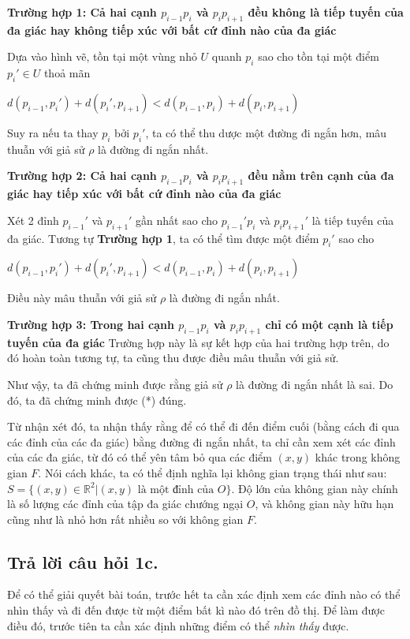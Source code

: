 \documentclass[a4paper, 11pt]{article}
\begin{document}
\textbf{Trường hợp 1: Cả hai cạnh $p_{i-1}p_i$ và $p_ip_{i+1}$ đều không là tiếp tuyến của đa giác hay không tiếp xúc với bất cứ đỉnh nào của đa giác}

Dựa vào hình vẽ, tồn tại một vùng nhỏ $U$ quanh $p_i$ sao cho tồn tại một điểm $p_i' \in U$ thoả mãn 
\begin{center}
  $d(p_{i-1}, p_i') + d(p_i', p_{i+1}) < d(p_{i-1}, p_i) + d(p_i, p_{i+1})$
\end{center}
Suy ra nếu ta thay $p_i$ bởi $p_i'$, ta có thể thu dược một đường đi ngắn hơn, mâu thuẫn với giả sử $\rho$ là đường đi ngắn nhất.

\textbf{Trường hợp 2: Cả hai cạnh $p_{i-1}p_i$ và $p_ip_{i+1}$ đều nằm trên cạnh của đa giác hay tiếp xúc với bất cứ đỉnh nào của đa giác}

Xét 2 đỉnh $p_{i-1}'$ và $p_{i+1}'$ gần nhất sao cho $p_{i - 1}'p_i$ và $p_ip_{i+1}'$ là tiếp tuyến của đa giác. Tương tự \textbf{Trường hợp 1}, ta có thể tìm được một điểm $p_i'$ sao cho
\begin{center}
  $d(p_{i-1}, p_i') + d(p_i', p_{i+1}) < d(p_{i-1}, p_i) + d(p_i, p_{i+1})$
\end{center}
Điều này mâu thuẫn với giả sử $\rho$ là đường đi ngắn nhất.

\textbf{Trường hợp 3: Trong hai cạnh $p_{i-1}p_i$ và $p_ip_{i+1}$ chỉ có một cạnh là tiếp tuyến của đa giác}
Trường hợp này là sự kết hợp của hai trường hợp trên, do đó hoàn toàn tương tự, ta cũng thu được điều mâu thuẫn với giả sử.

Như vậy, ta đã chứng minh được rằng giả sử $\rho$ là đường đi ngắn nhất là sai. Do đó, ta đã chứng minh được (*) đúng. 

Từ nhận xét đó, ta nhận thấy rằng để có thể đi đến điểm cuối (bằng cách đi qua các đỉnh của các đa giác) bằng đường đi ngắn nhất, ta chỉ cần xem xét các đỉnh của các đa giác, từ đó có thể yên tâm bỏ qua các điểm $(x, y)$ khác trong không gian $F$. Nói cách khác, ta có thể định nghĩa lại không gian trạng thái như sau: $S = \{(x, y) \in \mathbb{R}^2 | (x, y) \text{ là một đỉnh của } O \}$. Độ lớn của không gian này chính là số lượng các đỉnh của tập đa giác chướng ngại $O$, và không gian này hữu hạn cũng như là nhỏ hơn rất nhiều so với không gian $F$.

\subsection{Trả lời câu hỏi 1c.}
Để có thể giải quyết bài toán, trước hết ta cần xác định xem các đỉnh nào có thể nhìn thấy và đi đến được từ một điểm bất kì nào đó trên đồ thị. Để làm được điều đó, trước tiên ta cần xác định những điểm có thể \textit{nhìn thấy} được.
\end{document}
